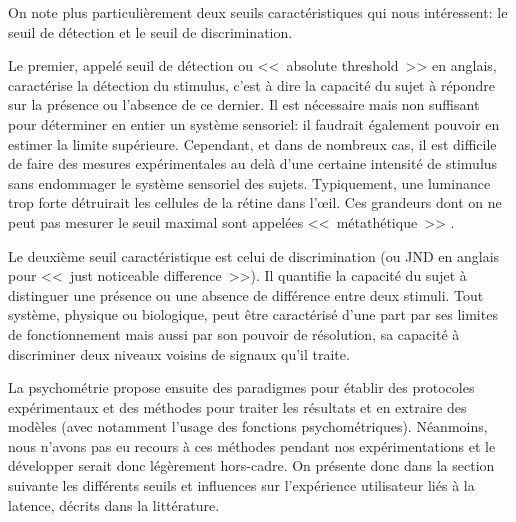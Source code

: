 	\par On note plus particulièrement deux seuils caractéristiques qui nous intéressent: le seuil de détection et le seuil de discrimination. 
	
	\par Le premier, appelé seuil de détection ou <<~absolute threshold~>> en anglais, caractérise la détection du stimulus, c'est à dire la capacité du sujet à répondre sur la présence ou l'absence de ce dernier. Il est nécessaire mais non suffisant pour déterminer en entier un système sensoriel: il faudrait également pouvoir en estimer la limite supérieure. Cependant, et dans de nombreux cas, il est difficile de faire des mesures expérimentales au delà d'une certaine intensité de stimulus sans endommager le système sensoriel des sujets. Typiquement, une luminance trop forte détruirait les cellules de la rétine dans l'œil. Ces grandeurs dont on ne peut pas mesurer le seuil maximal sont appelées <<~métathétique~>> \citep{stevens_psychophysical_1957}.
	
	\par Le deuxième seuil caractéristique est celui de discrimination (ou JND en anglais pour <<~just noticeable difference~>>). Il quantifie la capacité du sujet à distinguer une présence ou une absence de différence entre deux stimuli. Tout système, physique ou biologique, peut être caractérisé d'une part par ses limites de fonctionnement mais aussi par son pouvoir de résolution, sa capacité à discriminer deux niveaux voisins de signaux qu'il traite.
	
	\par La psychométrie propose ensuite des paradigmes pour établir des protocoles expérimentaux et des méthodes pour traiter les résultats et en extraire des modèles (avec notamment l'usage des fonctions psychométriques). Néanmoins, nous n'avons pas eu recours à ces méthodes pendant nos expérimentations et le développer serait donc légèrement hors-cadre. On présente donc dans la section suivante les différents seuils et influences sur l'expérience utilisateur liés à la latence, décrits dans la littérature.
	

